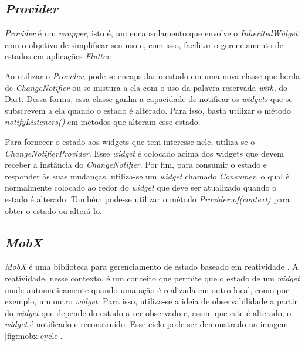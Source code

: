\subsection{\textit{Provider}}
\label{cap2:Subsec:Provider}

\textit{Provider} é um \textit{wrapper}, isto é, um encapsulamento que envolve o \textit{InheritedWidget} com o objetivo de simplificar seu uso e, com isso, facilitar o gerenciamento de estados em aplicações \textit{Flutter}.

Ao utilizar o \textit{Provider}, pode-se encapsular o estado em uma nova classe que herda de \textit{ChangeNotifier} ou se mistura a ela com o uso da palavra reservada \textit{with}, do Dart. Dessa forma, essa classe ganha a capacidade de notificar os \textit{widgets} que se subscrevem a ela quando o estado é alterado. Para isso, basta utilizar o método \textit{notifyListeners()} em métodos que alteram esse estado.

Para fornecer o estado aos widgets que tem interesse nele, utiliza-se o \textit{ChangeNotifierProvider}. Esse \textit{widget} é colocado acima dos widgets que devem receber a instância do \textit{ChangeNotifier}. Por fim, para consumir o estado e responder às suas mudanças, utiliza-se um \textit{widget} chamado \textit{Consumer}, o qual é normalmente colocado ao redor do \textit{widget} que deve ser atualizado quando o estado é alterado. Também pode-se utilizar o método \textit{Provider.of(context)} para obter o estado ou alterá-lo.

\subsection{\textit{MobX}}
\label{cap2:Subsec:MobX}
\textit{MobX} é uma biblioteca para gerenciamento de estado baseado em reatividade \cite{mobx-package}. A reatividade, nesse contexto, é um conceito que permite que o estado de um \textit{widget} mude automaticamente quando uma ação é realizada em outro local, como por exemplo, um outro \textit{widget}. Para isso, utiliza-se a ideia de observabilidade a partir do \textit{widget} que depende do estado a ser observado e, assim que este é alterado, o \textit{widget} é notificado e reconstruído. Esse ciclo pode ser demonstrado na imagem \ref{fig:mobx-cycle}.


